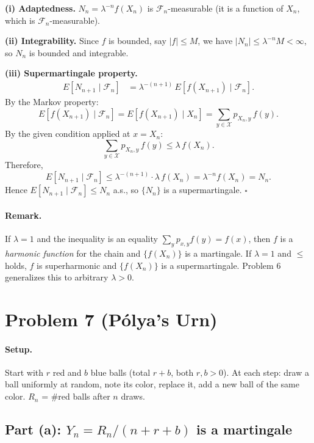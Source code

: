 \documentclass[11pt]{article}
\newcommand{\1}{\mathbf{1}}
\theoremstyle{plain}
\begin{document}
\textbf{(i) Adaptedness.}
$N_n=\lambda^{-n}f(X_n)$ is $\mathcal{F}_n$-measurable (it is a function of $X_n$,
which is $\mathcal{F}_n$-measurable).

\textbf{(ii) Integrability.}
Since $f$ is bounded, say $|f|\le M$, we have $|N_n|\le\lambda^{-n}M<\infty$, so
$N_n$ is bounded and integrable.

\textbf{(iii) Supermartingale property.}
\begin{align*}
  E[N_{n+1}\mid\mathcal{F}_n]
  &= \lambda^{-(n+1)}\,E[f(X_{n+1})\mid\mathcal{F}_n].
\end{align*}
By the Markov property:
\[
  E[f(X_{n+1})\mid\mathcal{F}_n]
  = E[f(X_{n+1})\mid X_n]
  = \sum_{y\in\mathcal{X}}p_{X_n,y}\,f(y).
\]
By the given condition applied at $x=X_n$:
\[
  \sum_{y\in\mathcal{X}}p_{X_n,y}\,f(y) \le \lambda\,f(X_n).
\]
Therefore,
\[
  E[N_{n+1}\mid\mathcal{F}_n]
  \le \lambda^{-(n+1)}\cdot\lambda\,f(X_n)
  = \lambda^{-n}f(X_n) = N_n.
\]
Hence $E[N_{n+1}\mid\mathcal{F}_n]\le N_n$ a.s., so $\{N_n\}$ is a supermartingale.
$\square$

\paragraph{Remark.}
If $\lambda=1$ and the inequality is an equality $\sum_y p_{x,y}f(y)=f(x)$, then
$f$ is a \emph{harmonic function} for the chain and $\{f(X_n)\}$ is a martingale.
If $\lambda=1$ and $\le$ holds, $f$ is superharmonic and $\{f(X_n)\}$ is a supermartingale.
Problem 6 generalizes this to arbitrary $\lambda>0$.

\section*{Problem 7 (P\'olya's Urn)}

\paragraph{Setup.}
Start with $r$ red and $b$ blue balls (total $r+b$, both $r,b>0$). At each step:
draw a ball uniformly at random, note its color, replace it, add a new ball of
the same color. $R_n$ = \#red balls after $n$ draws.

\subsection*{Part (a): $Y_n=R_n/(n+r+b)$ is a martingale}
\end{document}
